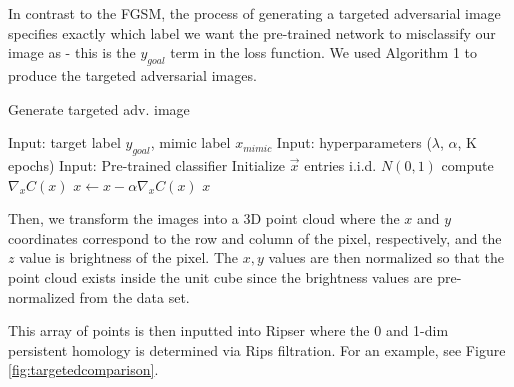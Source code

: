 \documentclass[twoside,twocolumn]{article}
\begin{document}
In contrast to the FGSM, the process of generating a targeted adversarial image specifies exactly which label we want the pre-trained network to misclassify our image as - this is the $y_{goal}$ term in the loss function. We used Algorithm 1 to produce the targeted adversarial images.

\begin{algorithm}
\caption{Generate targeted adv. image}
\begin{algorithmic}
\STATE Input: target label $y_{goal}$, mimic label $x_{mimic}$
\STATE Input: hyperparameters ($\lambda$, $\alpha$, K epochs)
\STATE Input: Pre-trained classifier
\STATE Initialize $\vec{x}$ entries i.i.d. $N(0,1)$
    \STATE compute $\nabla_x C(x)$
    \STATE $x \gets x - \alpha \nabla_x C(x)$
\ENDFOR
\RETURN $x$
\end{algorithmic}
\end{algorithm}


Then, we transform the images into a 3D point cloud where the $x$ and $y$ coordinates correspond to the row and column of the pixel, respectively, and the $z$ value is brightness of the pixel. The $x,y$ values are then normalized so that the point cloud exists inside the unit cube since the brightness values are pre-normalized from the data set. 

This array of points is then inputted into Ripser where the 0 and 1-dim persistent homology is determined via Rips filtration. For an example, see Figure \ref{fig:targetedcomparison}.

\end{document}

